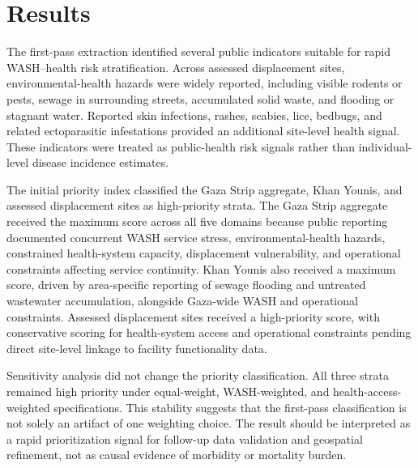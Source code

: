 \section{Results}

The first-pass extraction identified several public indicators suitable for rapid WASH--health risk stratification. Across assessed displacement sites, environmental-health hazards were widely reported, including visible rodents or pests, sewage in surrounding streets, accumulated solid waste, and flooding or stagnant water. Reported skin infections, rashes, scabies, lice, bedbugs, and related ectoparasitic infestations provided an additional site-level health signal. These indicators were treated as public-health risk signals rather than individual-level disease incidence estimates.

The initial priority index classified the Gaza Strip aggregate, Khan Younis, and assessed displacement sites as high-priority strata. The Gaza Strip aggregate received the maximum score across all five domains because public reporting documented concurrent WASH service stress, environmental-health hazards, constrained health-system capacity, displacement vulnerability, and operational constraints affecting service continuity. Khan Younis also received a maximum score, driven by area-specific reporting of sewage flooding and untreated wastewater accumulation, alongside Gaza-wide WASH and operational constraints. Assessed displacement sites received a high-priority score, with conservative scoring for health-system access and operational constraints pending direct site-level linkage to facility functionality data.

Sensitivity analysis did not change the priority classification. All three strata remained high priority under equal-weight, WASH-weighted, and health-access-weighted specifications. This stability suggests that the first-pass classification is not solely an artifact of one weighting choice. The result should be interpreted as a rapid prioritization signal for follow-up data validation and geospatial refinement, not as causal evidence of morbidity or mortality burden.
